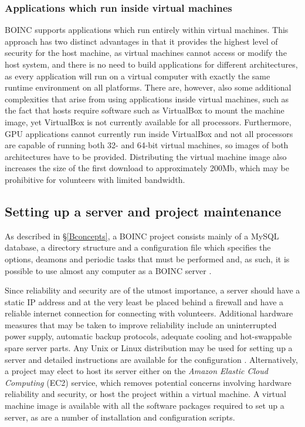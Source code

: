 \subsubsection{Applications which run inside virtual machines} \label{Bvmach}
BOINC supports applications which run entirely within virtual machines. This approach has two distinct advantages in that it provides the highest level of security for the host machine, as virtual machines cannot access or modify the host system, and there is no need to build applications for different architectures, as every application will run on a virtual computer with exactly the same runtime environment on all platforms.  
There are, however, also some additional complexities that arise from using applications inside virtual machines, such as the fact  that hosts require software such as VirtualBox to mount the machine image, yet VirtualBox  is not currently available for all processors. Furthermore, GPU applications cannot currently run inside VirtualBox and not all processors are capable of running both 32- and 64-bit virtual machines, so images of both architectures   have to be provided. Distributing the virtual machine image also increases the size of the first download to approximately 200Mb, which may be prohibitive for volunteers with limited bandwidth.

\subsection{Setting up a server and project maintenance} \label{Bserver}
As described in \S \ref{Bconcepts},   a BOINC project consists mainly of a MySQL database, a directory structure and a configuration file which specifies the options, deamons and periodic tasks that must be performed and, as such, it is possible to use almost any computer as a  BOINC server \cite{boincwiki}.

Since   reliability and security are of the utmost importance, a server should have a static IP address and at the very least be placed behind a firewall and have a reliable internet connection for connecting with volunteers. Additional hardware measures that may  be taken to improve reliability  include an uninterrupted power supply, automatic backup protocols, adequate cooling and hot-swappable spare server parts. Any Unix or Linux distribution may be used for setting up a server and  detailed instructions are available for the configuration \cite{boincwiki}. 
Alternatively, a project may elect to host its server either on the \emph{Amazon Elastic Cloud Computing} (EC2) service, which removes   potential concerns involving hardware reliability and security, or host the project within a virtual machine. A virtual machine image is available with all the software packages required to set up a server, as are a number of installation and configuration scripts.  

